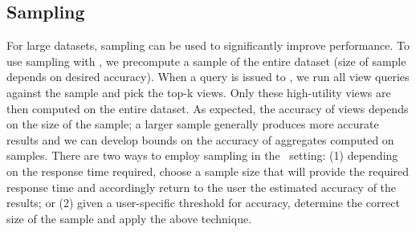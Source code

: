  \subsection {Sampling}
  For large datasets, sampling can be used to significantly improve
  performance. To use sampling with \SeeDB, we precompute a sample of the
  entire dataset (size of sample depends on desired accuracy). When a query is
  issued to \SeeDB, we run all view queries against the sample and pick the
  top-k views. Only these high-utility views are then computed on the entire
  dataset. As expected, the accuracy of views depends on the size of the sample;
  a larger sample generally produces more accurate results and we can develop
  bounds on the accuracy of aggregates computed on samples.
  There are two ways to employ sampling in the \SeeDB\ setting:
  (1) depending on the response time required, choose a sample size that will
  provide the required response time and accordingly return to the user the
  estimated accuracy of the results; or (2) given a user-specific threshold for
  accuracy, determine the correct size of the sample and apply the above
  technique. 
  
